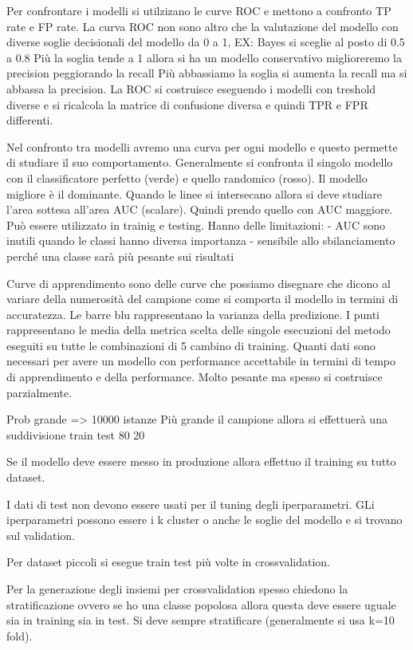 Per confrontare i modelli si utilzizano le curve ROC e mettono a confronto TP rate
e FP rate. La curva ROC non sono altro che la valutazione del modello con diverse
soglie decisionali del modello da 0 a 1, EX: Bayes si sceglie al posto di 0.5 a 0.8 
Più la soglia tende a 1 allora si ha un modello conservativo miglioreremo la precision
peggiorando la recall
Più abbassiamo la soglia si aumenta la recall ma si abbassa la precision.
La ROC si costruisce eseguendo i modelli con treshold diverse e si ricalcola la 
matrice di confusione diversa e quindi TPR e FPR differenti.

Nel confronto tra modelli avremo una curva per ogni modello e questo permette di 
studiare il suo comportamento. Generalmente si confronta il singolo modello con il
classificatore perfetto (verde) e quello randomico (rosso). Il modello migliore è
il dominante. Quando le linee si intersecano allora si deve studiare l'area sottesa 
all'area AUC (scalare). Quindi prendo quello con AUC maggiore. Può essere utilizzato 
in trainig e testing.
Hanno delle limitazioni:
- AUC sono inutili quando le classi hanno diversa importanza 
- sensibile allo sbilanciamento perché una classe sarà più pesante sui risultati


Curve di apprendimento sono delle curve che possiamo disegnare che dicono al variare
della numerosità del campione come si comporta il modello in termini di accuratezza.
Le barre blu rappresentano la varianza della predizione. I punti rappresentano
le media della metrica scelta delle singole esecuzioni del metodo eseguiti su tutte le combinazioni
di 5 cambino di training. 
Quanti dati sono necessari per avere un modello con performance accettabile in termini
di tempo di apprendimento e della performance. Molto pesante ma spesso si costruisce 
parzialmente.

Prob grande => 10000 istanze 
Più grande il campione allora si effettuerà una suddivisione train test 80 20

Se il modello deve essere messo in produzione allora effettuo il training su tutto 
dataset.

I dati di test non devono essere usati per il tuning degli iperparametri. GLi
iperparametri possono essere i k cluster o anche le soglie del modello e si trovano
sul validation.

Per dataset piccoli si esegue train test più volte in crossvalidation.

Per la generazione degli insiemi per crossvalidation spesso chiedono la stratificazione
ovvero se ho una classe popolosa allora questa deve essere uguale sia in training sia in
test. Si deve sempre stratificare (generalmente si usa k=10 fold). 

